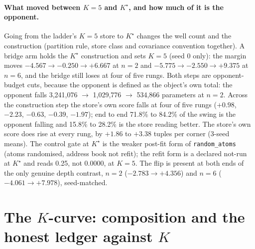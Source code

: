 \documentclass{article} %
\newcommand{\Kstar}{\ensuremath{K^{\star}}}
\begin{document}
\paragraph{What moved between $K=5$ and $\Kstar$, and how much of it is the opponent.} Going from
the ladder's $K=5$ store to $\Kstar$ changes the well count and the construction (partition rule,
store class and covariance convention together). A bridge arm holds the $\Kstar$ construction and
sets $K=5$ (seed 0 only): the margin moves $-4.567\to-0.250\to+6.667$ at $n=2$ and
$-5.775\to-2.550\to+9.375$ at $n=6$, and the bridge still loses at four of five rungs.
Both steps are opponent-budget cuts, because the opponent is defined as the object's own total: the
opponent falls 3,241,076 $\to$ 1,029,776 $\to$ 534,866 parameters at $n=2$. Across the construction
step the store's own score falls at four of five rungs ($+0.98$, $-2.23$, $-0.63$, $-0.39$, $-1.97$);
end to end 71.8\% to 84.2\% of the swing is the opponent falling and 15.8\% to 28.2\% is the store
reading better. %
The store's own score does rise at every rung, by $+1.86$ to $+3.38$ tuples per corner (3-seed
means). %
The control gate at $\Kstar$ is the weaker post-fit form of \texttt{random\_atoms} (atoms
randomised, address book not refit); the refit form is a declared not-run at $\Kstar$ and reads
0.25, not 0.0000, at $K=5$. %
The flip is present at both ends of the only genuine depth contrast, $n=2$ ($-2.783\to+4.356$) and
$n=6$ ($-4.061\to+7.978$), seed-matched. %

\section{The $K$-curve: composition and the honest ledger against $K$}
\label{app:kcurve}
\end{document}
